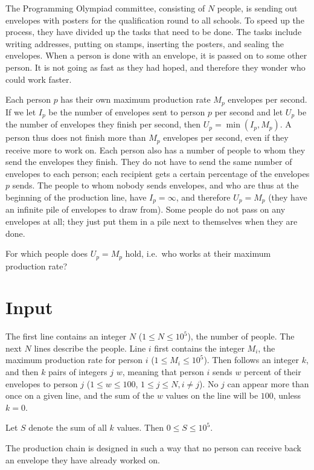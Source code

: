 The Programming Olympiad committee, consisting of $N$ people, is sending out envelopes with posters for the qualification round to all schools.
To speed up the process, they have divided up the tasks that need to be done.
The tasks include writing addresses, putting on stamps, inserting the posters, and sealing the envelopes.
When a person is done with an envelope, it is passed on to some other person.
It is not going as fast as they had hoped, and therefore they wonder who could work faster.

Each person $p$ has their own maximum production rate $M_p$ envelopes per second.
If we let $I_p$ be the number of envelopes sent to person $p$ per second and let $U_p$ be the number of envelopes they finish per second, then $U_p = \min(I_p, M_p)$.
A person thus does not finish more than $M_p$ envelopes per second, even if they receive more to work on.
Each person also has a number of people to whom they send the envelopes they finish.
They do not have to send the same number of envelopes to each person; each recipient gets a certain percentage of the envelopes $p$ sends.
The people to whom nobody sends envelopes, and who are thus at the beginning of the production line, have $I_p = \infty$, and therefore $U_p = M_p$ (they have an infinite pile of envelopes to draw from).
Some people do not pass on any envelopes at all; they just put them in a pile next to themselves when they are done.

For which people does $U_p = M_p$ hold, i.e.\ who works at their maximum production rate?

\section*{Input}
The first line contains an integer $N$ ($1 \le N \le 10^5$), the number of people.
The next $N$ lines describe the people. Line $i$ first contains the integer $M_i$, the maximum production rate for person $i$ ($1 \le M_i \le 10^5$).
Then follows an integer $k$, and then $k$ pairs of integers $j$ $w$, meaning that person $i$ sends $w$ percent of their envelopes to person $j$ ($1 \le w \le 100$, $1 \le j \le N, i \neq j$).
No $j$ can appear more than once on a given line, and the sum of the $w$ values on the line will be $100$, unless $k = 0$.

Let $S$ denote the sum of all $k$ values. Then $0 \le S \le 10^5$.

The production chain is designed in such a way that no person can receive back an envelope they have already worked on.

